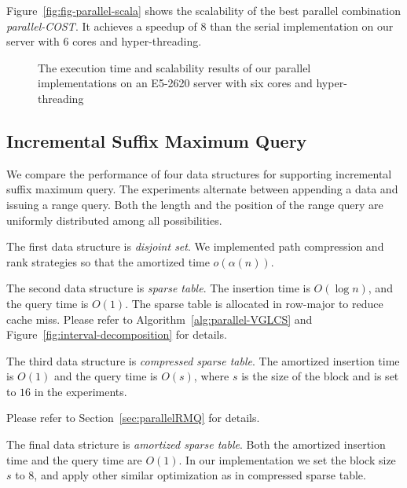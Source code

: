 Figure~\ref{fig:fig-parallel-scala} shows the scalability of the best
parallel combination {\em parallel-COST}.  It achieves a speedup of
$8$ than the serial implementation on our server with 6 cores and
hyper-threading.

\iffalse
我們運行優化策略中的空間壓縮版本，而非理論分析的 $\theta(1)$ 操作，
單次詢問落在 $O(s)$ 中，在實作上由於可以完全壓在暫存器上操作，效能表現較佳。
\fi

\begin{figure}
  \centering
  \caption{The execution time and scalability results of our parallel
    implementations on an E5-2620 server with six cores and
    hyper-threading}
\end{figure}


\subsection{Incremental Suffix Maximum Query}

We compare the performance of four data structures for supporting
incremental suffix maximum query.  The experiments alternate between
appending a data and issuing a range query.  Both the length and the
position of the range query are uniformly distributed among all
possibilities.

The first data structure is {\em disjoint set}.  We implemented path
compression and rank strategies so that the amortized time
$o(\alpha(n))$.


The second data structure is {\em sparse table}.  The insertion time
is $O(\log n)$, and the query time is $O(1)$.  The sparse table is
allocated in row-major to reduce cache miss.  Please refer to
Algorithm~\ref{alg:parallel-VGLCS} and
Figure~\ref{fig:interval-decomposition} for details.

The third data structure is {\em compressed sparse table}.  The
amortized insertion time is $O(1)$ and the query time is $O(s)$, where
$s$ is the size of the block and is set to $16$ in the experiments.

Please refer to Section~\ref{sec:parallelRMQ} for details.

The final data stricture is {\em amortized sparse table}.  Both the
amortized insertion time and the query time are $O(1)$.  In our
implementation we set the block size $s$ to $8$, and apply other
similar optimization as in compressed sparse table.

